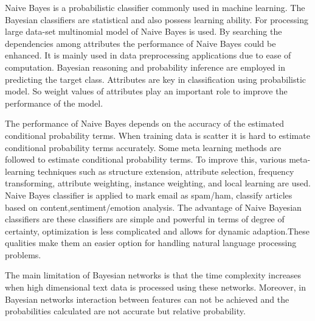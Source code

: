 Naive Bayes is a probabilistic classifier commonly used in machine learning\cite{yoo2015classification}. The Bayesian classifiers are statistical and also possess learning ability. For processing large data-set multinomial model of Naive Bayes is used. By searching the dependencies among attributes the performance of Naive Bayes could be enhanced. It is mainly used in data preprocessing applications due to ease of computation. Bayesian reasoning and probability inference are employed in predicting the target class. Attributes are key in classification using probabilistic model. So weight values of attributes play an important role to improve the performance of the model. %
\par
\vspace{0.5cm}
The performance of Naive Bayes depends on the accuracy of the estimated conditional probability terms. When training data is scatter it is hard to estimate conditional probability terms accurately. Some meta learning methods are followed to estimate conditional probability terms. To improve this, various meta-learning techniques such as structure extension, attribute selection, frequency transforming, attribute weighting, instance weighting, and local learning are used. Naive Bayes classifier is applied to mark email as spam/ham, classify articles based on content,sentiment/emotion analysis.%
The advantage of Naive Bayesian classifiers are these classifiers are simple and  powerful in terms of degree of certainty, optimization is less complicated and allows for dynamic adaption.These qualities  make them an easier option for handling natural language processing problems. \par
\vspace{.5cm}
The main limitation of Bayesian networks is that the time complexity increases when high dimensional text data is processed using these networks. Moreover, in Bayesian networks interaction between features can not be achieved and the probabilities calculated are not accurate but relative probability.

